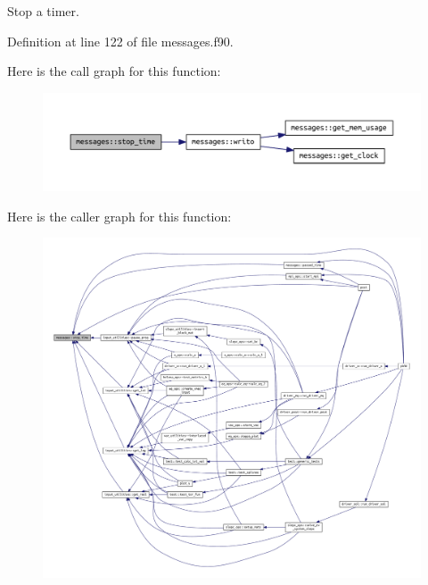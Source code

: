 Stop a timer. 



Definition at line 122 of file messages.\+f90.

Here is the call graph for this function\+:\nopagebreak
\begin{figure}[H]
\begin{center}
\leavevmode
\includegraphics[width=350pt]{namespacemessages_aed343894ae4a28ad6dfbd1d39aac64ff_cgraph}
\end{center}
\end{figure}
Here is the caller graph for this function\+:\nopagebreak
\begin{figure}[H]
\begin{center}
\leavevmode
\includegraphics[width=350pt]{namespacemessages_aed343894ae4a28ad6dfbd1d39aac64ff_icgraph}
\end{center}
\end{figure}
\mbox{\label{namespacemessages_aa4a8d01563e92558e8a0875b075ec54c}} 
